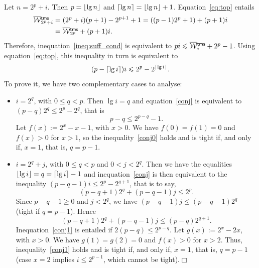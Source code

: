 Let \(n = 2^p + i\). Then \(p = \lfloor{\lg n}\rfloor\) and \(\lceil{\lg n}\rceil
= \lfloor{\lg n}\rfloor + 1\). Equation~\eqref{eq:top} 
entails
\begin{align*}
\OW{\fun{tms}}{2^p+i} &=
(2^p+i)(p+1)-2^{p+1}+1 = ((p-1)2^p+1)+(p+1)i\\
&= \OW{\fun{tms}}{2^p} + (p+1)i.
\end{align*}
Therefore, inequation~\eqref{ineq:suff_cond} is equivalent to \(pi
\leqslant \OW{\fun{tms}}{i} + 2^p - 1\). Using
equation~\eqref{eq:top}, this inequality in turn is equivalent to
\begin{equation}
(p - \lceil{\lg i}\rceil)i \leqslant 2^p - 2^{\lceil{\lg i}\rceil}.
\label{conj}
\end{equation}
To prove it, we have two complementary cases to analyse:
\begin{itemize}

  \item \(i=2^q\), with \(0 \leqslant q < p\). Then \(\lg i = q\) and
    equation~\eqref{conj} is equivalent to \((p-q)2^q \leqslant 2^p -
    2^q\), that is
    \begin{equation}
      p-q \leqslant 2^{p-q} - 1.\label{conj0}
    \end{equation}
    Let \(f(x) := 2^x - x - 1\), with \(x > 0\). We have \(f(0) = f(1)
    = 0\) and \(f(x) > 0\) for \(x>1\), so the
    inequality~\eqref{conj0} holds and is tight if, and only if,
    \(x=1\), that is, \(q=p-1\).

  \item \(i = 2^q + j\), with \(0 \leqslant q < p\) and \(0 < j <
    2^q\). Then we have the equalities \(\lfloor{\lg i}\rfloor = q =
    \lceil{\lg i}\rceil - 1\) and inequation~\eqref{conj} is then
    equivalent to the inequality \((p-q-1)i \leqslant 2^p - 2^{q+1}\),
    that is to say,
    \begin{equation}
      (p-q+1)2^q + (p-q-1)j \leqslant 2^p.\label{conj1}
    \end{equation}
    Since \(p-q-1 \geqslant 0\) and \(j < 2^q\), we have \((p-q-1)j
    \leqslant (p-q-1)2^q\) (tight if \(q=p-1\)). Hence
    \begin{equation*}
      (p-q+1)2^q+(p-q-1)j \leqslant (p-q)2^{q+1}.
    \end{equation*}
    Inequation~\eqref{conj1} is entailed if \(2(p-q)
    \leqslant 2^{p-q}\). Let \(g(x) := 2^x - 2x\), with \(x > 0\). We
    have \(g(1) = g(2) = 0\) and \(f(x) > 0\) for \(x > 2\). Thus,
    inequality~\eqref{conj1} holds and is tight if, and only if,
    \(x=1\), that is, \(q=p-1\) (case \(x=2\) implies \(i
    \leqslant 2^{p-1}\), which cannot be tight).\hfill\(\Box\)

\end{itemize}

